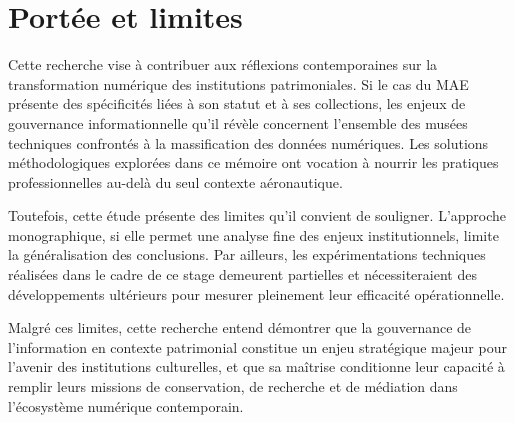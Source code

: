 \section*{Portée et limites}

Cette recherche vise à contribuer aux réflexions contemporaines sur la transformation numérique des institutions patrimoniales. Si le cas du MAE présente des spécificités liées à son statut et à ses collections, les enjeux de gouvernance informationnelle qu'il révèle concernent l'ensemble des musées techniques confrontés à la massification des données numériques. Les solutions méthodologiques explorées dans ce mémoire ont vocation à nourrir les pratiques professionnelles au-delà du seul contexte aéronautique.

Toutefois, cette étude présente des limites qu'il convient de souligner. L'approche monographique, si elle permet une analyse fine des enjeux institutionnels, limite la généralisation des conclusions. Par ailleurs, les expérimentations techniques réalisées dans le cadre de ce stage demeurent partielles et nécessiteraient des développements ultérieurs pour mesurer pleinement leur efficacité opérationnelle.

Malgré ces limites, cette recherche entend démontrer que la gouvernance de l'information en contexte patrimonial constitue un enjeu stratégique majeur pour l'avenir des institutions culturelles, et que sa maîtrise conditionne leur capacité à remplir leurs missions de conservation, de recherche et de médiation dans l'écosystème numérique contemporain.